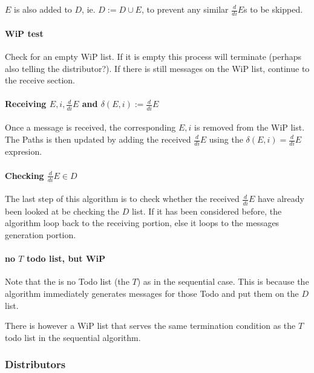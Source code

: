 \documentclass[a4paper,11pt]{report}
\begin{document}
$E$ is also added to $D$, ie. $D:=D\cup {E}$, to prevent any similar
$\frac{d}{di}E$s to be skipped.

\paragraph{WiP test}
\label{sec:wip-test}

Check for an empty WiP list. If it is empty this process will
terminate (perhaps also telling the distributor?).  If there is still
messages on the WiP list, continue to the receive section.

\paragraph{Receiving ${E,i,\frac{d}{di}E}$ and $\delta(E,i):=\frac{d}{di}E$}
\label{sec:receiving-e-i}

Once a message is received, the corresponding ${E,i}$ is removed from
the WiP list. The Paths is then updated by adding the received
$\frac{d}{di}E$ using the $\delta(E,i)=\frac{d}{di}E$ expresion.

\paragraph{Checking $\frac{d}{di}E \in D$}

The last step of this algorithm is to check whether the received
$\frac{d}{di}E$ have already been looked at be checking the $D$
list. If it has been considered before, the algorithm loop back to the
receiving portion, else it loops to the messages generation portion.

\paragraph{no $T$ todo list, but WiP}
\label{sec:no-t-todo}


Note that the is no Todo list (the $T$) as in the sequential
case. This is because the algorithm immediately generates messages for
those Todo and put them on the $D$ list.

There is however a WiP list that serves the same termination condition
as the $T$ todo list in the sequential algorithm.


\subsubsection{Distributors}
\label{sec:distributors}
\end{document}
